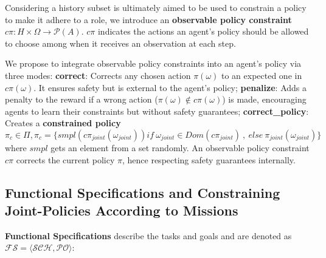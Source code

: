 \documentclass[sn-mathphys-num]{sn-jnl}%
\theoremstyle{thmstyleone}%
\theoremstyle{thmstyletwo}%
\theoremstyle{thmstylethree}%
\begin{document}
Considering a history subset is ultimately aimed to be used to constrain a policy to make it adhere to a role, we introduce an \textbf{observable policy constraint} $c\pi: H \times \Omega \rightarrow \mathcal{P}(A)$. $c\pi$ indicates the actions an agent's policy should be allowed to choose among when it receives an observation at each step.

%     

We propose to integrate observable policy constraints into an agent's policy via three modes:
\textbf{correct}: Corrects any chosen action $\pi(\omega)$ to an expected one in $c\pi(\omega)$. It ensures safety but is external to the agent's policy; \quad
\textbf{penalize}: Adds a penalty to the reward if a wrong action ($\pi(\omega) \notin c\pi(\omega)$) is made, encouraging agents to learn their constraints but without safety guarantees; \quad
\textbf{correct\_policy}: Creates a \textbf{constrained policy} $\pi_c \in \Pi, \pi_c = \{smpl(c\pi_{joint}(\omega_{joint})) \allowbreak if \ \omega_{joint} \in Dom(c\pi_{joint}) \ \allowbreak, \ \allowbreak else \ \allowbreak \pi_{joint}(\omega_{joint})\}$ where $smpl$ gets an element from a set randomly. An observable policy constraint $c\pi$ corrects the current policy $\pi$, hence respecting safety guarantees internally.



\subsection{Functional Specifications and Constraining Joint-Policies According to Missions}

\textbf{Functional Specifications} describe the tasks and goals and are denoted as $\mathcal{FS} = \langle \mathcal{SCH}, \mathcal{PO} \rangle$:
\end{document}
